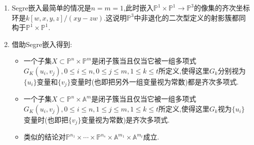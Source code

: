 \begin{enumerate}
\begin{enumerate}
\begin{proof}
			最后容易验证像集$Z$恰好被齐次多项式组$\{z_{ij}z_{kl}=z_{kj}z_{il},0\le i,k\le n,0\le j,l\le m\}$所定义,容易验证这是不可约射影代数集,于是同构的$Z$也是不可约的,于是它是射影簇.
		\end{proof}
		\item Segre嵌入最简单的情况是$n=m=1$,此时嵌入$\mathbb{P}^1\times\mathbb{P}^1\to\mathbb{P}^3$的像集的齐次坐标环是$k[w,x,y,z]/(xy-zw)$.这说明$\mathbb{P}^3$中非退化的二次型定义的射影簇都同构于$\mathbb{P}^1\times\mathbb{P}^1$.
		\item 借助Segre嵌入得到:
		\begin{itemize}
			\item 一个子集$X\subset\mathbb{P}^n\times\mathbb{P}^m$是闭子簇当且仅当它被一组多项式$G_K(u_i,v_j),0\le i\le n,0\le j\le m,1\le k\le t$所定义,使得这里$G_k$分别视为$\{u_i\}$变量和$\{v_j\}$变量时(也即把另外一组变量视为常数)都是齐次多项式.
			\item 一个子集$X\subset\mathbb{P}^n\times\mathbb{A}^m$是闭子簇当且仅当它被一组多项式$G_K(u_i,v_j),0\le i\le n,1\le j\le m,1\le k\le t$所定义,使得这里$G_k$视为$\{u_i\}$变量时(也即把$\{v_j\}$变量视为常数)是齐次多项式.
			\item 类似的结论对$\mathbb{P}^{n_1}\times\cdots\times\mathbb{P}^{n_s}\times\mathbb{A}^{m_1}\times\mathbb{A}^{m_t}$成立.
		\end{itemize}
	\end{enumerate}
\end{enumerate}

